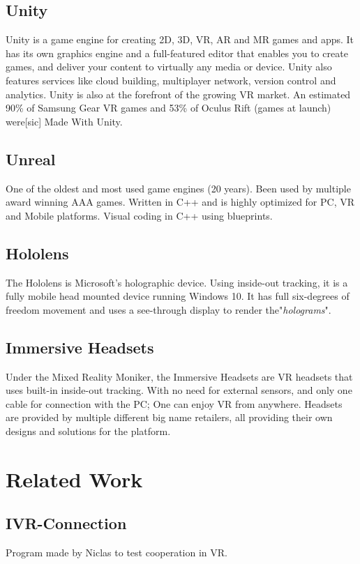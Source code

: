     \subsection{Unity}
    Unity is a game engine for creating 2D, 3D, VR, AR and MR games and apps. It has its own graphics engine and a full-featured editor that enables you to create games, and deliver your content to virtually any media or device. Unity also features services like cloud building, multiplayer network, version control and analytics. Unity is also at the forefront of the growing VR market. An estimated 90\% of Samsung Gear VR games and 53\% of Oculus Rift (games at launch) were[sic] Made With Unity. \cite{UnityAbout}
    
    \subsection{Unreal}
    One of the oldest and most used game engines (20 years). Been used by multiple award winning AAA games. Written in C++ and is highly optimized for PC, VR and Mobile platforms.
    Visual coding in C++ using blueprints.

    \subsection{Hololens}
    The Hololens is Microsoft's holographic device. Using inside-out tracking, it is a fully mobile head mounted device running Windows 10. It has full six-degrees of freedom movement and uses a see-through display to render the"\emph{holograms}".

    \subsection{Immersive Headsets}
    Under the Mixed Reality Moniker, the Immersive Headsets are VR headsets that uses built-in inside-out tracking. With no need for external sensors, and only one cable for connection with the PC; One can enjoy VR from anywhere. Headsets are provided by multiple different big name retailers, all providing their own designs and solutions for the platform.

\section{Related Work}
    
    \subsection{IVR-Connection}
    Program made by Niclas to test cooperation in VR.
    
